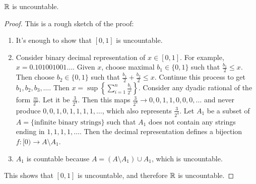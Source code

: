 \begin{theorem}
	$\mathbb{R} $ is uncountable.
	\begin{proof}
		This is a rough sketch of the proof:
		\begin{enumerate}
			\item It's enough to show that $[0,1]$ is uncountable.
			\item Consider binary decimal representation of $x \in [0,1]$.
			      For example, $x=0.101001001\ldots$.
			      Given $x$, choose maximal $b_1 \in \{0,1\}$ such that $\frac{b_1}{2}\le x$.
			      Then choose $b_2 \in \{0,1\} $ such that $\frac{b_1}{2}+\frac{b_2}{2} \le x$.
			      Continue this process to get $b_1,b_2,b_3,\ldots$.
			      Then $x=\sup{ \left\{ \sum_{i=1}^{n} \frac{b_i}{2^{i}} \right\} }$.
			      Consider any dyadic rational of the form $\frac{m}{2^{n}}$.
			      Let it be $\frac{3}{2^{4}}$. Then this maps $\frac{3}{2^{4}}\to 0,0,1,1,0,0,0, \ldots $ and never produce $0,0,1,0, 1,1,1,1, \ldots $, which also represents $\frac{3}{2^{4}}$.
			      Let $A_1$ be a subset of $A=\{\text{infinite binary strings}\}$ such that $A_1$ does not contain any strings ending in $1,1,1,1, \ldots $.
			      Then the decimal representation defines a bijection
			      $f: [0)\to A \setminus A_1$.
			\item $A_1$ is countable because $A=(A \setminus A_1) \cup A_1$, which is uncountable.
		\end{enumerate}
		This shows that $[0,1]$ is uncountable, and therefore $\mathbb{R} $ is uncountable.
	\end{proof}
\end{theorem}

